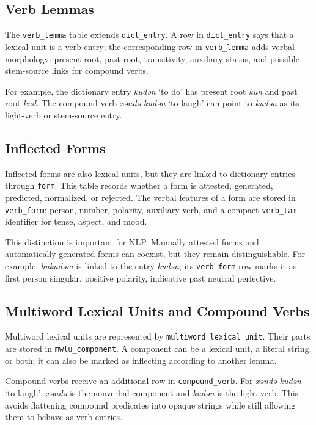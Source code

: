 \documentclass[11pt]{article}
\begin{document}
\subsection{Verb Lemmas}

The \texttt{verb\_lemma} table extends \texttt{dict\_entry}. A row in \texttt{dict\_entry} says that a lexical unit is a verb entry; the corresponding row in \texttt{verb\_lemma} adds verbal morphology: present root, past root, transitivity, auxiliary status, and possible stem-source links for compound verbs.

For example, the dictionary entry \textit{kudǝn} `to do' has present root \textit{kun} and past root \textit{kud}. The compound verb \textit{xǝndǝ kudǝn} `to laugh' can point to \textit{kudǝn} as its light-verb or stem-source entry.

\subsection{Inflected Forms}

Inflected forms are also lexical units, but they are linked to dictionary entries through \texttt{form}. This table records whether a form is attested, generated, predicted, normalized, or rejected. The verbal features of a form are stored in \texttt{verb\_form}: person, number, polarity, auxiliary verb, and a compact \texttt{verb\_tam} identifier for tense, aspect, and mood.

This distinction is important for NLP. Manually attested forms and automatically generated forms can coexist, but they remain distinguishable. For example, \textit{bukudǝm} is linked to the entry \textit{kudǝn}; its \texttt{verb\_form} row marks it as first person singular, positive polarity, indicative past neutral perfective.

\subsection{Multiword Lexical Units and Compound Verbs}

Multiword lexical units are represented by \texttt{multiword\_lexical\_unit}. Their parts are stored in \texttt{mwlu\_component}. A component can be a lexical unit, a literal string, or both; it can also be marked as inflecting according to another lemma.

Compound verbs receive an additional row in \texttt{compound\_verb}. For \textit{xǝndǝ kudǝn} `to laugh', \textit{xǝndǝ} is the nonverbal component and \textit{kudǝn} is the light verb. This avoids flattening compound predicates into opaque strings while still allowing them to behave as verb entries.
\end{document}
